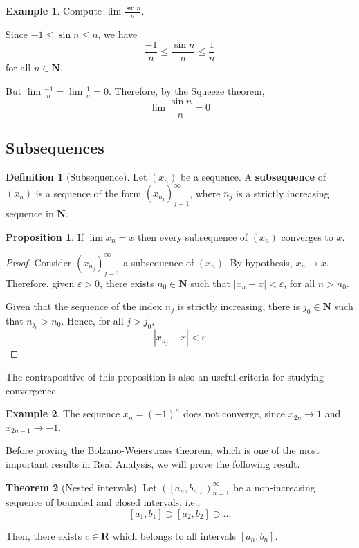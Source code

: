 \documentclass[tikz,12pt,a4paper]{article}
\theoremstyle{definition}
\newtheorem{theorem}{Theorem}[section]
\newtheorem{proposition}[theorem]{Proposition}
\newtheorem{example}{Example}[section]
\newtheorem{definition}{Definition}[section]
\begin{document}
\begin{example}
	Compute $\lim \frac{\sin n}{n}$.
	
	Since $-1 \leq \sin n \leq n$, we have \[ \frac{-1}{n} \leq \frac{\sin n}{n} \leq \frac{1}{n} \] for all $n \in \textbf{N}$.
	
	But $\lim \frac{-1}{n} = \lim \frac{1}{n} = 0$. Therefore, by the Squeeze theorem, \[ \lim \frac{\sin n}{n} = 0 \]
\end{example}

\subsection{Subsequences}

\begin{definition}[Subsequence]
	Let $(x_n)$ be a sequence. A \textbf{subsequence} of $(x_n)$ is a sequence of the form $(x_{n_j})_{j=1}^\infty$, where $n_j$ is a strictly increasing sequence in $\textbf{N}$. 
\end{definition}

\begin{proposition}
	If $\lim x_n = x$ then every subsequence of $(x_n)$ converges to $x$.
\end{proposition}

\begin{proof}
	Consider $(x_{n_j})_{j=1}^\infty$ a subsequence of $(x_n)$. By hypothesis, $x_n \longrightarrow x$. Therefore, given $\varepsilon > 0$, there exists $n_0 \in \textbf{N}$ such that $|x_n - x| < \varepsilon$, for all $n > n_0$.
	
	Given that the sequence of the index $n_j$ is strictly increasing, there is $j_0 \in \textbf{N}$ such that $n_{j_0} > n_0$. Hence, for all $j > j_0$, \[ | x_{n_j} - x | < \varepsilon \]
\end{proof}

The contrapositive of this proposition is also an useful criteria for studying convergence.

\begin{example}
	The sequence $x_n = (-1)^n$ does not converge, since $x_{2n} \longrightarrow 1$ and $x_{2n-1} \longrightarrow -1$.
\end{example}

Before proving the Bolzano-Weierstrass theorem, which is one of the most important results in Real Analysis, we will prove the following result.

\begin{theorem}[Nested intervals]\label{nested-intervals}
	Let $([a_n, b_n])_{n=1}^\infty$ be a non-increasing sequence of bounded and closed intervals, i.e., \[ [a_1, b_1] \supset [a_2, b_2] \supset \ldots \]
	
	Then, there exists $c \in \textbf{R}$ which belongs to all intervals $[a_n, b_n]$.
\end{theorem}
\end{document}
